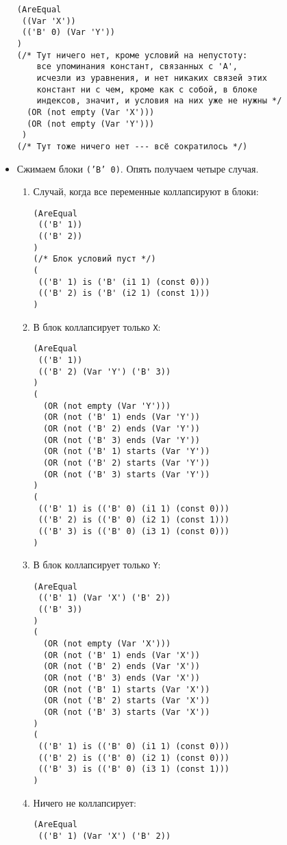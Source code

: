 \documentclass[12pt]{article}
\begin{document}
\begin{itemize}
\begin{verbatim}
(AreEqual 
 ((Var 'X')) 
 (('B' 0) (Var 'Y'))
)
(/* Тут ничего нет, кроме условий на непустоту: 
    все упоминания констант, связанных с 'A', 
    исчезли из уравнения, и нет никаких связей этих 
    констант ни с чем, кроме как с собой, в блоке
    индексов, значит, и условия на них уже не нужны */
  (OR (not empty (Var 'X')))
  (OR (not empty (Var 'Y')))    
 )
(/* Тут тоже ничего нет --- всё сократилось */)
\end{verbatim}
\item Сжимаем блоки \texttt{('B' 0)}. Опять получаем четыре случая.
\begin{enumerate}
\item Случай, когда все переменные коллапсируют в блоки:
\begin{verbatim}
(AreEqual 
 (('B' 1)) 
 (('B' 2))
)
(/* Блок условий пуст */)
( 
 (('B' 1) is ('B' (i1 1) (const 0))) 
 (('B' 2) is ('B' (i2 1) (const 1))) 
)
\end{verbatim}
\item В блок коллапсирует только \verb|X|:
\begin{verbatim}
(AreEqual 
 (('B' 1)) 
 (('B' 2) (Var 'Y') ('B' 3))
)
(
  (OR (not empty (Var 'Y')))
  (OR (not ('B' 1) ends (Var 'Y'))
  (OR (not ('B' 2) ends (Var 'Y'))
  (OR (not ('B' 3) ends (Var 'Y'))
  (OR (not ('B' 1) starts (Var 'Y'))
  (OR (not ('B' 2) starts (Var 'Y'))
  (OR (not ('B' 3) starts (Var 'Y'))
)
( 
 (('B' 1) is (('B' 0) (i1 1) (const 0))) 
 (('B' 2) is (('B' 0) (i2 1) (const 1))) 
 (('B' 3) is (('B' 0) (i3 1) (const 0))) 
)
\end{verbatim}
\item В блок коллапсирует только \verb|Y|:
\begin{verbatim}
(AreEqual 
 (('B' 1) (Var 'X') ('B' 2)) 
 (('B' 3))
)
(
  (OR (not empty (Var 'X')))
  (OR (not ('B' 1) ends (Var 'X'))
  (OR (not ('B' 2) ends (Var 'X'))
  (OR (not ('B' 3) ends (Var 'X'))
  (OR (not ('B' 1) starts (Var 'X'))
  (OR (not ('B' 2) starts (Var 'X'))
  (OR (not ('B' 3) starts (Var 'X'))
)
( 
 (('B' 1) is (('B' 0) (i1 1) (const 0))) 
 (('B' 2) is (('B' 0) (i2 1) (const 0))) 
 (('B' 3) is (('B' 0) (i3 1) (const 1))) 
)
\end{verbatim}
\item Ничего не коллапсирует:
\begin{verbatim}
(AreEqual 
 (('B' 1) (Var 'X') ('B' 2)) 

\end{verbatim}
\end{enumerate}
\end{itemize}
\end{document}
